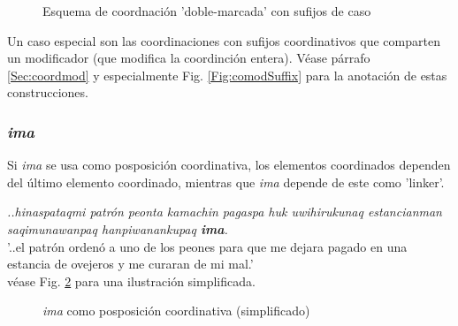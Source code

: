 \documentclass[a4paper,11pt,DIV12]{scrartcl}
\begin{document}
\begin{figure}
\begin{center}
\caption{Esquema de coordnaci\'on 'doble-marcada' con sufijos de caso}\label{Fig:coordwan}
\end{center}
\end{figure}

Un caso especial son las coordinaciones con sufijos coordinativos que comparten un modificador (que modifica la coordinci\'on entera). V\'ease p\'arrafo \ref{Sec:coordmod} y especialmente Fig. \ref{Fig:comodSuffix} para la anotaci\'on de estas construcciones.

  \subsubsection{{\em ima}}\label{Sec:imacoord}
  Si {\em ima} se usa como posposici\'on coordinativa, los elementos coordinados dependen del \'ultimo elemento coordinado, mientras que  {\em ima} depende de este como 'linker'.
\begin{examples}
 \item {\em  ..hinaspataqmi patrón peonta kamachin pagaspa huk uwihirukunaq estancianman saqimunawanpaq hanpiwanankupaq \textbf{ima}.}\\
 '..el patrón ordenó a uno de los peones para que me dejara pagado en una estancia de ovejeros y me curaran de mi mal.'\\
    v\'ease Fig. \ref{Fig:imacoord} para una ilustraci\'on simplificada.\\
	\hfill{\small \citep{Valderrama77}}
\end{examples}

\begin{figure}
\begin{center}
\caption{{\em ima} como posposici\'on coordinativa (simplificado)}\label{Fig:imacoord}
\end{center}
\end{figure}
\end{document}
